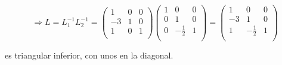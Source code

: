 $$\Rightarrow L = L_{1}^{-1}L_{2}^{-1} =
	\begin{pmatrix}
        1 & 0 & 0\\
        -3 & 1 & 0\\
       1 & 0 & 1\\
	\end{pmatrix}
	\begin{pmatrix}
        1 & 0 & 0\\
        0 & 1 & 0\\
        0 & -\frac{1}{2} & 1\\
	\end{pmatrix}
	=
	\begin{pmatrix}
        1 & 0 & 0\\
        -3 & 1 & 0\\
       1 & -\frac{1}{2} & 1\\
	\end{pmatrix}
$$

es triangular inferior, con unos en la diagonal.